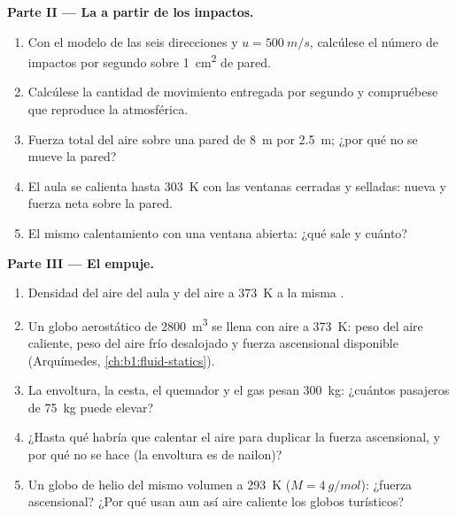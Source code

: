\begin{problem}
\medskip
\noindent\textbf{Parte II --- La  a partir de los impactos.}
\begin{enumerate}[resume]
  \item Con el modelo de las seis direcciones y $u = \qty{500}{m/s}$,
        calcúlese el número de impactos por segundo sobre \qty{1}{cm^2} de
        pared.
  \item Calcúlese la cantidad de movimiento entregada por segundo y
        compruébese que reproduce la  atmosférica.
  \item Fuerza total del aire sobre una pared de \qty{8}{m} por
        \qty{2.5}{m}; ¿por qué no se mueve la pared?
  \item El aula se calienta hasta \qty{303}{K} con las ventanas cerradas y
        selladas: nueva  y fuerza neta sobre la pared.
  \item El mismo calentamiento con una ventana abierta: ¿qué sale y cuánto?
\end{enumerate}

\medskip
\noindent\textbf{Parte III --- El empuje.}
\begin{enumerate}[resume]
  \item Densidad del aire del aula y del aire a \qty{373}{K} a la misma
        .
  \item Un globo aerostático de \qty{2800}{m^3} se llena con aire a
        \qty{373}{K}: peso del aire caliente, peso del aire frío desalojado
        y fuerza ascensional disponible (Arquímedes,
        \cref{ch:b1:fluid-statics}).
  \item La envoltura, la cesta, el quemador y el gas pesan \qty{300}{kg}:
        ¿cuántos pasajeros de \qty{75}{kg} puede elevar?
  \item ¿Hasta qué  habría que calentar el aire para duplicar
        la fuerza ascensional, y por qué no se hace (la envoltura es de
        nailon)?
  \item Un globo de helio del mismo volumen a \qty{293}{K}
        ($M = \qty{4}{g/mol}$): ¿fuerza ascensional? ¿Por qué usan aun así
        aire caliente los globos turísticos?
\end{enumerate}


\end{problem}
